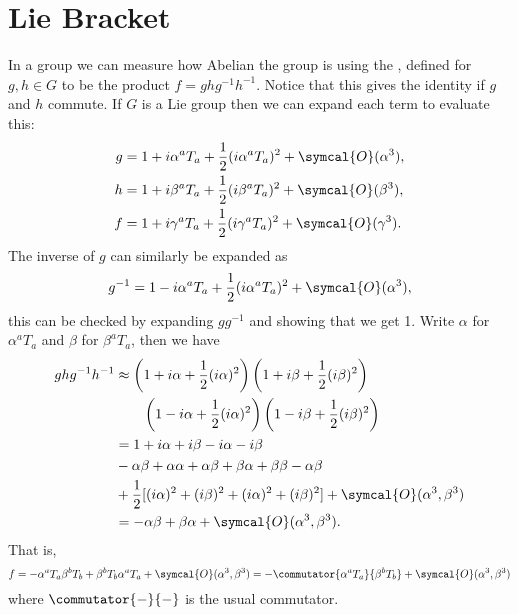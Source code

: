 \documentclass[fleqn]{NotesClass}
\newcommand{\order}{\symcal{O}}
\begin{document}
    \section{Lie Bracket}
    In a group we can measure how Abelian the group is using the , defined for \(g, h \in G\) to be the product \(f = ghg^{-1}h^{-1}\).
    Notice that this gives the identity if \(g\) and \(h\) commute.
    If \(G\) is a Lie group then we can expand each term to evaluate this:
    \begin{align}
        g &= 1 + i\alpha^aT_a + \frac{1}{2}(i\alpha^aT_a)^2 + \order(\alpha^3),\\
        h &= 1 + i\beta^aT_a + \frac{1}{2}(i\beta^aT_a)^2 + \order(\beta^3),\\
        f &= 1 + i\gamma^aT_a + \frac{1}{2}(i\gamma^aT_a)^2 + \order(\gamma^3).
    \end{align}
    The inverse of \(g\) can similarly be expanded as
    \begin{equation}
        g^{-1} = 1 - i\alpha^aT_a + \frac{1}{2}(i\alpha^aT_a)^2 + \order(\alpha^3),
    \end{equation}
    this can be checked by expanding \(gg^{-1}\) and showing that we get 1.
    Write \(\alpha\) for \(\alpha^aT_a\) and \(\beta\) for \(\beta^aT_a\), then we have
    \begin{align}
        ghg^{-1}h^{-1} &\approx \left( 1 + i\alpha + \frac{1}{2}(i\alpha)^2 \right)\left( 1 + i\beta + \frac{1}{2}(i\beta)^2 \right)\\
        &\qquad\left( 1 - i\alpha + \frac{1}{2}(i\alpha)^2 \right)\left( 1 - i\beta + \frac{1}{2}(i\beta)^2 \right)\\
        &= 1 + i\alpha + i\beta - i\alpha - i\beta\\
        &- \alpha\beta + \alpha\alpha + \alpha\beta + \beta\alpha + \beta\beta -\alpha\beta\\
        &+ \frac{1}{2}[(i\alpha)^2 + (i\beta)^2 + (i\alpha)^2 + (i\beta)^2] + \order(\alpha^3, \beta^3)\\
        &= -\alpha\beta + \beta\alpha + \order(\alpha^3, \beta^3).
    \end{align}
    That is,
    \begin{equation}
        f = -\alpha^aT_a \beta^bT_b + \beta^bT_b\alpha^aT_a + \order(\alpha^3, \beta^3) = -\commutator{\alpha^aT_a}{\beta^bT_b} + \order(\alpha^3, \beta^3)
    \end{equation}
    where \(\commutator{-}{-}\) is the usual commutator.
    
\end{document}
